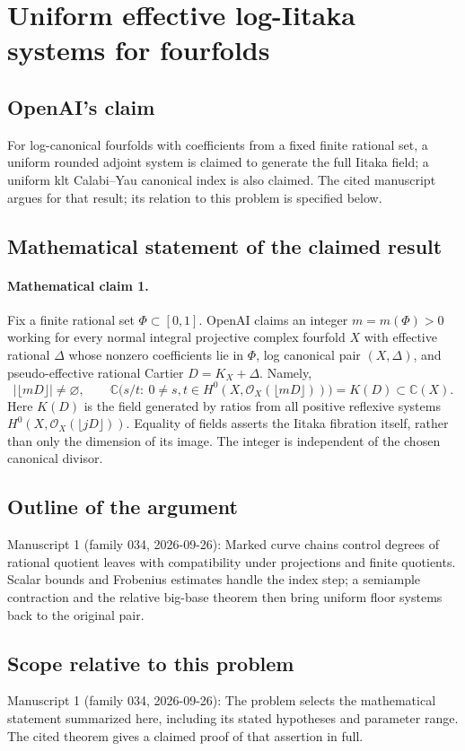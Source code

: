 \documentclass[11pt]{article}
\begin{document}
\section*{Uniform effective log-Iitaka systems for fourfolds}

\subsection{OpenAI's claim}
For log-canonical fourfolds with coefficients from a fixed finite rational set, a uniform rounded adjoint system is claimed to generate the full Iitaka field; a uniform klt Calabi--Yau canonical index is also claimed. The cited manuscript argues for that result; its relation to this problem is specified below.

\subsection{Mathematical statement of the claimed result}
\paragraph{Mathematical claim 1.} Fix a finite rational set $\Phi\subset[0,1]$. OpenAI claims an integer $m=m(\Phi)>0$ working for every normal integral projective complex fourfold $X$ with effective rational $\Delta$ whose nonzero coefficients lie in $\Phi$, log canonical pair $(X,\Delta)$, and pseudo-effective rational Cartier $D=K_X+\Delta$. Namely,
\[
|\lfloor mD\rfloor|\ne\varnothing,\qquad
\mathbb C\bigl(s/t:\ 0\ne s,t\in H^0(X,\mathcal O_X(\lfloor mD\rfloor))\bigr)=K(D)\subset\mathbb C(X).
\]
Here $K(D)$ is the field generated by ratios from all positive reflexive systems $H^0(X,\mathcal O_X(\lfloor jD\rfloor))$. Equality of fields asserts the Iitaka fibration itself, rather than only the dimension of its image. The integer is independent of the chosen canonical divisor.

\subsection{Outline of the argument}
Manuscript 1 (family 034, 2026-09-26): Marked curve chains control degrees of rational quotient leaves with compatibility under projections and finite quotients. Scalar bounds and Frobenius estimates handle the index step; a semiample contraction and the relative big-base theorem then bring uniform floor systems back to the original pair.

\subsection{Scope relative to this problem}
Manuscript 1 (family 034, 2026-09-26): The problem selects the mathematical statement summarized here, including its stated hypotheses and parameter range. The cited theorem gives a claimed proof of that assertion in full.
\end{document}
